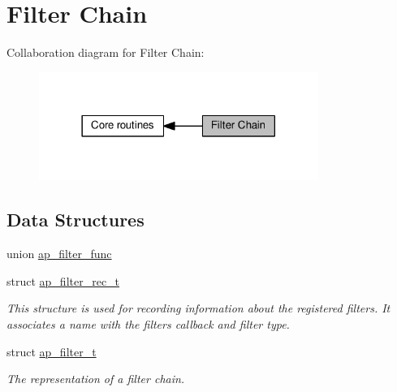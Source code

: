 \hypertarget{group__APACHE__CORE__FILTER}{}\section{Filter Chain}
\label{group__APACHE__CORE__FILTER}
Collaboration diagram for Filter Chain\+:
\nopagebreak
\begin{figure}[H]
\begin{center}
\leavevmode
\includegraphics[width=258pt]{group__APACHE__CORE__FILTER}
\end{center}
\end{figure}
\subsection*{Data Structures}
\begin{DoxyCompactItemize}
\item 
union \hyperlink{unionap__filter__func}{ap\+\_\+filter\+\_\+func}
\item 
struct \hyperlink{structap__filter__rec__t}{ap\+\_\+filter\+\_\+rec\+\_\+t}
\begin{DoxyCompactList}\small\item\em This structure is used for recording information about the registered filters. It associates a name with the filter\textquotesingle{}s callback and filter type. \end{DoxyCompactList}\item 
struct \hyperlink{structap__filter__t}{ap\+\_\+filter\+\_\+t}
\begin{DoxyCompactList}\small\item\em The representation of a filter chain. \end{DoxyCompactList}\end{DoxyCompactItemize}
